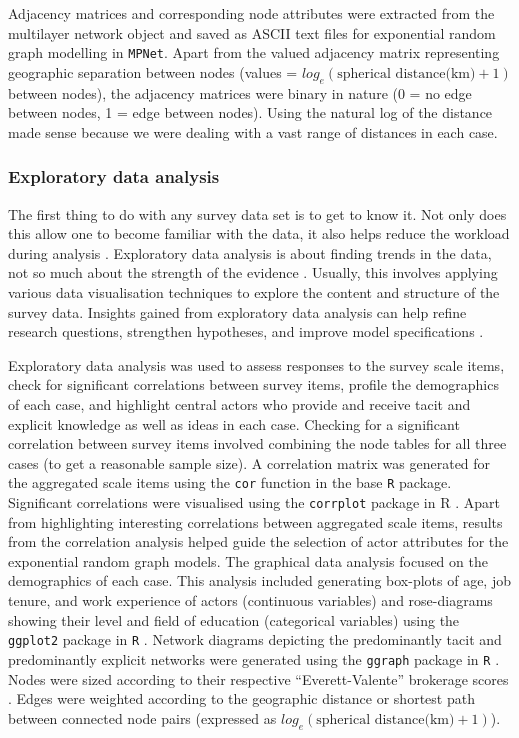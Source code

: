 Adjacency matrices and corresponding node attributes were extracted from the multilayer network object and saved as ASCII text files for exponential random graph modelling in \texttt{MPNet}. Apart from the valued adjacency matrix representing geographic separation between nodes (values = $log_e(\text{spherical distance(km)} + 1)$ between nodes), the adjacency matrices were binary in nature (0 = no edge between nodes, 1 = edge between nodes). Using the natural log of the distance made sense because we were dealing with a vast range of distances in each case. 

\subsubsection{Exploratory data analysis}

The first thing to do with any survey data set is to get to know it. Not only does this allow one to become familiar with the data, it also helps reduce the workload during analysis \citep{cox2017translating}. Exploratory data analysis is about finding trends in the data, not so much about the strength of the evidence \citep{morgenthaler2009exploratory}. Usually, this involves applying various data visualisation techniques to explore the content and structure of the survey data. Insights gained from exploratory data analysis can help refine research questions, strengthen hypotheses, and improve model specifications \citep{jebb2017exploratory}. \medskip

Exploratory data analysis was used to assess responses to the survey scale items, check for significant correlations between survey items, profile the demographics of each case, and highlight central actors who provide and receive tacit and explicit knowledge as well as ideas in each case. Checking for a significant correlation between survey items involved combining the node tables for all three cases (to get a reasonable sample size). A correlation matrix was generated for the aggregated scale items using the \texttt{cor} function in the base \texttt{R} package. Significant correlations were visualised using the \texttt{corrplot} package in R \citep{wei2017corrplot}. Apart from highlighting interesting correlations between aggregated scale items, results from the correlation analysis helped guide the selection of actor attributes for the exponential random graph models. The graphical data analysis focused on the demographics of each case. This analysis included generating box-plots of age, job tenure, and work experience of actors (continuous variables) and rose-diagrams showing their level and field of education (categorical variables) using the \texttt{ggplot2} package in \texttt{R} \citep{wickham2016ggplot2}. Network diagrams depicting the predominantly tacit and predominantly explicit networks were generated using the \texttt{ggraph} package in \texttt{R} \citep{pedersen2019ggraph}. Nodes were sized according to their respective \enquote{Everett-Valente} brokerage scores \citep[][see explanation of this score below]{everett2016bridging}. Edges were weighted according to the geographic distance or shortest path between connected node pairs (expressed as $log_e(\text{spherical distance(km)} + 1)$). 

